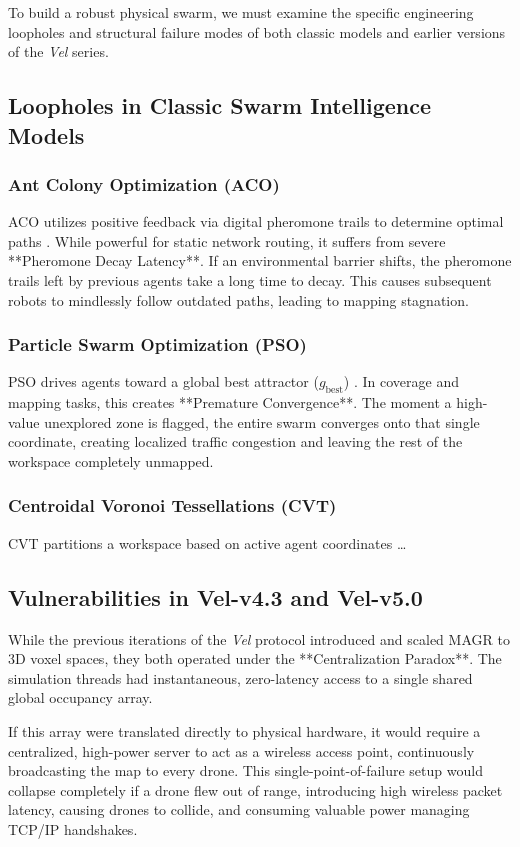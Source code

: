 \documentclass[letterpaper, 10pt, conference]{IEEEtran}
\begin{document}
To build a robust physical swarm, we must examine the specific engineering loopholes and structural failure modes of both classic models and earlier versions of the \textit{Vel} series.

\subsection{Loopholes in Classic Swarm Intelligence Models}
\subsubsection{Ant Colony Optimization (ACO)}
ACO utilizes positive feedback via digital pheromone trails to determine optimal paths \cite{dorigo2006ant}. While powerful for static network routing, it suffers from severe **Pheromone Decay Latency**. If an environmental barrier shifts, the pheromone trails left by previous agents take a long time to decay. This causes subsequent robots to mindlessly follow outdated paths, leading to mapping stagnation.

\subsubsection{Particle Swarm Optimization (PSO)}
PSO drives agents toward a global best attractor ($g_{\text{best}}$) \cite{gad2022pso}. In coverage and mapping tasks, this creates **Premature Convergence**. The moment a high-value unexplored zone is flagged, the entire swarm converges onto that single coordinate, creating localized traffic congestion and leaving the rest of the workspace completely unmapped.

\subsubsection{Centroidal Voronoi Tessellations (CVT)}
CVT partitions a workspace based on active agent coordinates \dots

\subsection{Vulnerabilities in Vel-v4.3 and Vel-v5.0}
While the previous iterations of the \textit{Vel} protocol introduced and scaled MAGR to 3D voxel spaces, they both operated under the **Centralization Paradox**. The simulation threads had instantaneous, zero-latency access to a single shared global occupancy array. 

If this array were translated directly to physical hardware, it would require a centralized, high-power server to act as a wireless access point, continuously broadcasting the map to every drone. This single-point-of-failure setup would collapse completely if a drone flew out of range, introducing high wireless packet latency, causing drones to collide, and consuming valuable power managing TCP/IP handshakes.
\end{document}
